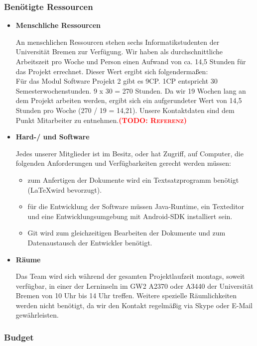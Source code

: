 \documentclass[fontsize=12pt,paper=a4,twoside]{scrartcl}
\newcommand{\todo}[1]{\textbf{\textsc{\textcolor{red}{(TODO: #1)}}}}
\begin{document}
\subsubsection{Benötigte Ressourcen}

\begin{itemize}
\item \textbf{Menschliche Ressourcen}

An menschlichen Ressourcen stehen sechs Informatikstudenten der Universität Bremen zur Verfügung. Wir haben als durchschnittliche Arbeitszeit pro Woche und Person einen Aufwand von ca. 14,5 Stunden für das Projekt errechnet. Dieser Wert ergibt sich folgendermaßen:\\
Für das Modul Software Projekt 2 gibt es 9CP. 1CP entspricht 30 Semesterwochenstunden. 9 x 30 = 270 Stunden. Da wir 19 Wochen lang an dem Projekt arbeiten werden, ergibt sich ein aufgerundeter Wert von 14,5 Stunden pro Woche (270 / 19 = 14,21). Unsere Kontaktdaten sind dem Punkt Mitarbeiter zu entnehmen.\todo{Referenz}

\item \textbf{Hard-/ und Software}

Jedes unserer Mitglieder ist im Besitz, oder hat Zugriff, auf Computer, die folgenden Anforderungen und Verfügbarkeiten gerecht werden müssen:

\begin{itemize}
\item zum Anfertigen der Dokumente wird ein Textsatzprogramm benötigt (\LaTeX wird bevorzugt).
\item für die Entwicklung der Software müssen Java-Runtime, ein Texteditor und eine Entwicklungsumgebung mit Android-SDK installiert sein.
\item Git wird zum gleichzeitigen Bearbeiten der Dokumente und zum Datenaustausch der Entwickler benötigt.
\end{itemize}

\item \textbf{Räume}

Das Team wird sich während der gesamten Projektlaufzeit montags, soweit verfügbar, in einer der Lerninseln im GW2 A2370 oder A3440 der Universität Bremen von 10 Uhr bis 14 Uhr treffen. Weitere spezielle Räumlichkeiten werden nicht benötigt, da wir den Kontakt regelmäßig via Skype oder E-Mail gewährleisten.

\end{itemize}

\subsubsection{Budget}
\end{document}
